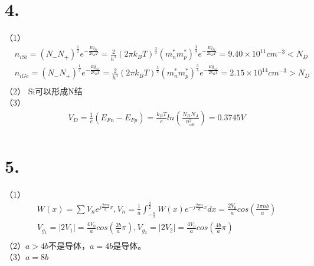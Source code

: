 \documentclass[UTF8]{ctexart}
\begin{document}
\section*{4.}
（1）
\begin{equation*}
    \begin{aligned}
        & n_{iSi}=(N_{-}N_{+})^{\frac{1}{2}}e^{-\frac{Eg_{Si}}{2k_BT}}=\frac{2}{h^3}(2\pi k_BT)^{\frac{3}{2}}
        (m_n^*m_p^*)^{\frac{3}{4}}e^{-\frac{Eg_{Si}}{2k_BT}}=9.40\times10^{11}cm^{-3}<N_D\\
        & n_{iGe}=(N_{-}N_{+})^{\frac{1}{2}}e^{-\frac{Eg_{Ge}}{2k_BT}}=\frac{2}{h^3}(2\pi k_BT)^{\frac{3}{2}}
        (m_n^*m_p^*)^{\frac{3}{4}}e^{-\frac{Eg_{Ge}}{2k_BT}}=2.15\times10^{14}cm^{-3}>N_D\\
    \end{aligned}
\end{equation*}
（2）
Si可以形成N结\\
（3）
\begin{equation*}
    \begin{aligned}
        & V_D=\frac{1}{e}(E_{Fn}-E_{Fp})=\frac{k_BT}{e}ln(\frac{N_DN_A}{n_{iSi}^2})=0.3745V\\
    \end{aligned}
\end{equation*}
\section*{5.}
（1）
\begin{equation*}
    \begin{aligned}
        &W(x) = \sum V_n e^{j\frac{2\pi n}{a}x}, V_n = \frac{1}{a}\int_{-\frac{a}{2}}^{\frac{a}{2}}W(x)e^{-j\frac{2\pi n}{a}x}dx 
        =\frac{2V_0}{a}cos(\frac{2\pi nb}{a})\\
        &V_{g_1} = \lvert 2V_1\rvert = \frac{4V_0}{a}cos(\frac{2b}{a}\pi), 
        V_{g_2} = \lvert 2V_2\rvert = \frac{4V_0}{a}cos(\frac{4b}{a}\pi)\\
    \end{aligned}
\end{equation*}
（2）$a>4b$不是导体，$a=4b$是导体。\\
（3）$a=8b$\\
\end{document}
